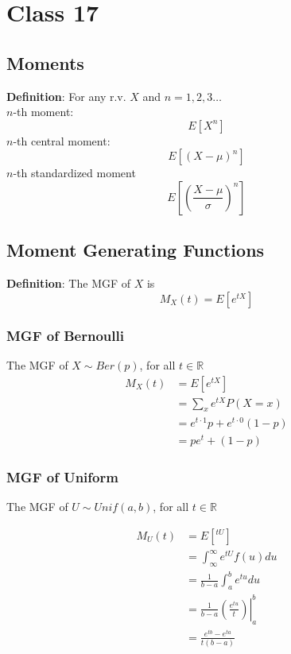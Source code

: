 \chapter{Class 17}

\section{Moments}
\begin{framed}
   \textbf{Definition}: For any r.v. $X$ and $n = 1, 2, 3 \hdots$ \\ 

   $n$-th moment:
   \[
     E\left[ X^n\right]  
   \] 
   $n$-th central moment:
   \[
     E\left[ (X - \mu)^n\right]  
   \] 
   $n$-th standardized moment
   \[
     E\left[  \left( \frac{X - \mu}{\sigma} \right)^n \right] 
   \] 
\end{framed}

\section{Moment Generating Functions}
\begin{framed}
   \textbf{Definition}: The MGF of $X$ is
   \[
      M_X(t) = E\left[ e^{tX}\right] 
   \] 
\end{framed}

\subsection{MGF of Bernoulli} 

The MGF of  $X \sim Ber(p)$, for all $t \in \mathbb{R}$
\begin{align*}
   M_X(t) &= E\left[ e^{tX}\right]  \\
          &= \sum_{x} e^{tX} P(X = x) \\
          &= e^{t \cdot 1} p + e^{t \cdot 0} (1-p) \\
          &= pe^{t} + (1 - p)
\end{align*}

\subsection{MGF of Uniform}

The MGF of $U \sim Unif(a, b)$, for all  $t \in \mathbb{R}$

\begin{align*}
   M_U(t) &= E\left[ ^{tU}\right]  \\
          &= \int_{\infty}^{\infty}   e^{tU} f(u) du \\
          &= \frac{1}{b - a} \int_{a}^{ b}  e^{tu} du \\
          &= \frac{1}{b - a} \left. \left( \frac{e^{tu}}{t} \right)  \right|_{a}^{b}  \\
          &= \frac{e^{tb} - e^{ta} }{t (b - a)}
\end{align*}

